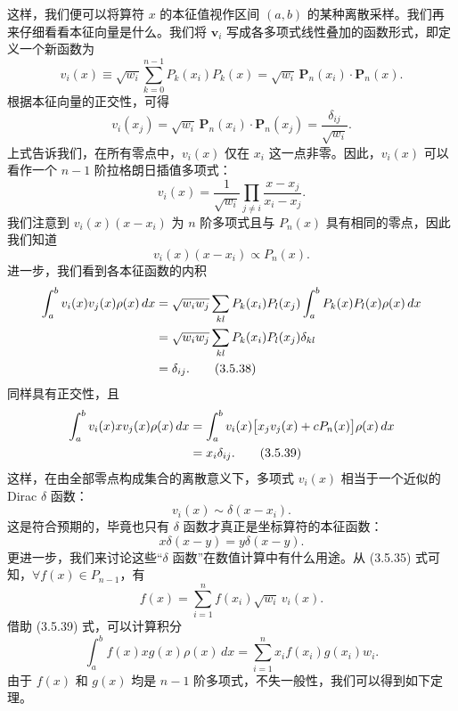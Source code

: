 这样，我们便可以将算符 $x$ 的本征值视作区间 $(a,b)$ 的某种离散采样。我们再来仔细看看本征向量是什么。我们将 $\bm v_i$ 写成各多项式线性叠加的函数形式，即定义一个新函数为
\begin{equation}
v_i(x)\equiv\sqrt{w_i}\sum_{k=0}^{n-1}P_k(x_i)P_k(x)
=\sqrt{w_i}\,\bm P_n(x_i)\cdot\bm P_n(x).
\tag{3.5.34}
\end{equation}
根据本征向量的正交性，可得
\begin{equation}
v_i(x_j)=\sqrt{w_i}\,\bm P_n(x_i)\cdot\bm P_n(x_j)
=\frac{\delta_{ij}}{\sqrt{w_i}}.
\tag{3.5.35}
\end{equation}
上式告诉我们，在所有零点中，$v_i(x)$ 仅在 $x_i$ 这一点非零。因此，$v_i(x)$ 可以看作一个 $n-1$ 阶拉格朗日插值多项式：
\begin{equation}
v_i(x)=\frac1{\sqrt{w_i}}\prod_{j\ne i}\frac{x-x_j}{x_i-x_j}.
\tag{3.5.36}
\end{equation}
我们注意到 $v_i(x)(x-x_i)$ 为 $n$ 阶多项式且与 $P_n(x)$ 具有相同的零点，因此我们知道
\begin{equation}
v_i(x)(x-x_i)\propto P_n(x).
\tag{3.5.37}
\end{equation}
进一步，我们看到各本征函数的内积
\begin{align}
\int_a^b v_i(x)v_j(x)\rho(x)\,dx
&=\sqrt{w_iw_j}\sum_{kl}P_k(x_i)P_l(x_j)\int_a^bP_k(x)P_l(x)\rho(x)\,dx\notag\\
&=\sqrt{w_iw_j}\sum_{kl}P_k(x_i)P_l(x_j)\delta_{kl}\notag\\
&=\delta_{ij}.
\tag{3.5.38}
\end{align}
同样具有正交性，且
\begin{align}
\int_a^b v_i(x)xv_j(x)\rho(x)\,dx
&=\int_a^b v_i(x)\bigl[x_jv_j(x)+cP_n(x)\bigr]\rho(x)\,dx\notag\\
&=x_i\delta_{ij}.
\tag{3.5.39}
\end{align}
这样，在由全部零点构成集合的离散意义下，多项式 $v_i(x)$ 相当于一个近似的 Dirac $\delta$ 函数：
\begin{equation}
v_i(x)\sim\delta(x-x_i).
\tag{3.5.40}
\end{equation}
这是符合预期的，毕竟也只有 $\delta$ 函数才真正是坐标算符的本征函数：
\begin{equation}
x\delta(x-y)=y\delta(x-y).
\tag{3.5.41}
\end{equation}
更进一步，我们来讨论这些“$\delta$ 函数”在数值计算中有什么用途。从 (3.5.35) 式可知，$\forall f(x)\in P_{n-1}$，有
\begin{equation}
f(x)=\sum_{i=1}^n f(x_i)\sqrt{w_i}\,v_i(x).
\tag{3.5.42}
\end{equation}
借助 (3.5.39) 式，可以计算积分
\begin{equation}
\int_a^b f(x)xg(x)\rho(x)\,dx
=\sum_{i=1}^n x_if(x_i)g(x_i)w_i.
\tag{3.5.43}
\end{equation}
由于 $f(x)$ 和 $g(x)$ 均是 $n-1$ 阶多项式，不失一般性，我们可以得到如下定理。

